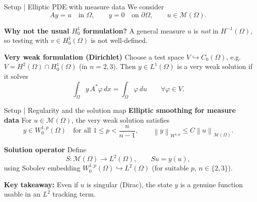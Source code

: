 \documentclass[aspectratio=169]{beamer}
\newcommand{\Om}{\Omega}
\newcommand{\M}{\mathcal{M}}
\newcommand{\norm}[1]{\left\lVert #1\right\rVert}
\begin{document}
\begin{frame}{Setup | Elliptic PDE with measure data}
We consider
\[
Ay = u \quad \text{in }\Om,\qquad y=0 \quad\text{on }\partial\Om,
\qquad u\in \M(\Om).
\]

\textbf{Why not the usual $H^1_0$ formulation?}\newline
A general measure $u$ is \emph{not} in $H^{-1}(\Om)$, so
testing with $v\in H^1_0(\Om)$ is not well-defined.

\vspace{1em}

\textbf{Very weak formulation (Dirichlet)} \newline
Choose a test space $V \hookrightarrow C_0(\Om)$, e.g.
$V = H^2(\Om)\cap H^1_0(\Om)$ (in $n=2,3$).
Then $y\in L^1(\Om)$ is a very weak solution if it solves
\[
\int_\Om y\, A^\ast \varphi\, dx = \int_\Om \varphi\, du
\qquad \forall \varphi\in V.
\]

\end{frame}

\begin{frame}{Setup | Regularity and the solution map}
\textbf{Elliptic smoothing for measure data}\newline
For $u\in \M(\Om)$, the very weak solution satisfies
\[
y \in W^{1,p}_0(\Om)\quad \text{for all } 1\le p < \frac{n}{n-1},
\qquad
\norm{y}_{W^{1,p}} \le C \norm{u}_{\M(\Om)}.
\]

\textbf{Solution operator} \newline
Define
\[
S:\M(\Om)\to L^2(\Om),\qquad Su = y(u),
\]
using Sobolev embedding $W^{1,p}_0(\Om)\hookrightarrow L^2(\Om)$ (for suitable $p$, $n\in\{2,3\}$).

\textbf{Key takeaway: }
Even if $u$ is singular (Dirac), the state $y$ is a genuine function usable in an $L^2$ tracking term.

\end{frame}
\end{document}
